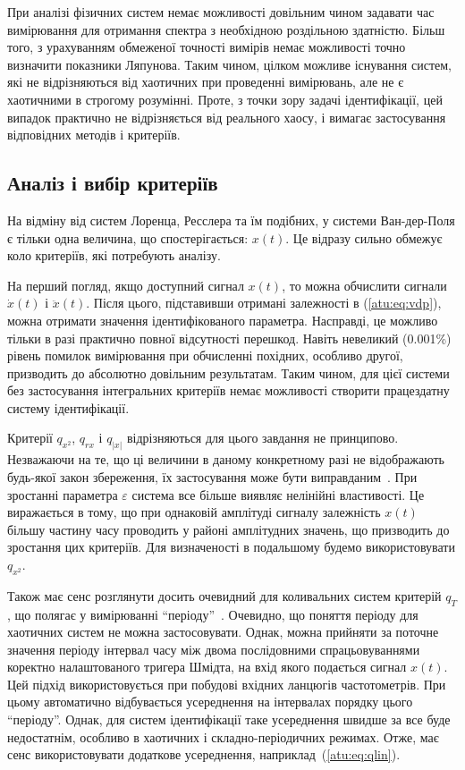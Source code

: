При аналізі фізичних систем немає можливості довільним чином
задавати час вимірювання для отримання спектра з необхідною
роздільною здатністю. Більш того, з урахуванням обмеженої точності вимірів
немає можливості точно визначити показники Ляпунова. Таким
чином, цілком можливе існування систем, які не відрізняються
від хаотичних при проведенні вимірювань, але не є хаотичними в
строгому розумінні. Проте, з точки зору задачі ідентифікації,
цей випадок практично не відрізняється від реального хаосу,
і вимагає застосування відповідних методів і критеріїв.



\subsection{Аналіз і вибір критеріїв}%

На відміну від систем Лоренца, Ресслера та їм подібних, у системи
Ван-дер-Поля є тільки одна величина, що спостерігається: $x(t)$. Це
відразу сильно обмежує коло критеріїв, які потребують аналізу.

На перший погляд, якщо доступний сигнал
$x(t)$, то можна обчислити сигнали
$\dot{x}(t) $ і
$\ddot{x}(t)$. Після цього, підставивши отримані залежності
в (\ref{atu:eq:vdp}), можна отримати значення ідентифікованого
параметра. Насправді, це можливо тільки в разі практично
повної відсутності перешкод. Навіть невеликий (0.001\%) рівень
помилок вимірювання при обчисленні похідних, особливо другої,
призводить до абсолютно довільним результатам. Таким чином,
для цієї системи без застосування інтегральних критеріїв
немає можливості створити працездатну систему ідентифікації.

Критерії
$q_{x^2}$,
$q_{rx}$ і
$q_{|x|}$ відрізняються для цього завдання не
принципово. Незважаючи на те, що ці величини в даному конкретному
разі не відображають будь-якої закон збереження, їх застосування
може бути виправданим~\cite{atu_asau17}. При зростанні параметра
$\varepsilon$ система все більше виявляє нелінійні властивості. Це
виражається в тому, що при однаковій амплітуді сигналу
залежність
$x(t)$ більшу частину часу проводить у районі амплітудних
значень, що призводить до зростання цих критеріїв. Для
визначеності в подальшому будемо використовувати
$q_{x^2}$.

Також має сенс розглянути досить очевидний для коливальних
систем критерій
$q_T$, що полягає у вимірюванні ``періоду''~\cite{atu_asau16}. Очевидно, що
поняття періоду для хаотичних систем не можна застосовувати. Однак,
можна прийняти за поточне значення періоду інтервал часу між
двома послідовними спрацьовуваннями коректно налаштованого
тригера Шмідта, на вхід якого подається сигнал
$x(t)$. Цей підхід використовується при побудові вхідних
ланцюгів частотометрів. При цьому автоматично відбувається
усереднення на інтервалах порядку цього ``періоду''. Однак,
для систем ідентифікації таке усереднення швидше за все
буде недостатнім, особливо в хаотичних і складно-періодичних
режимах. Отже, має сенс використовувати додаткове усереднення,
наприклад~(\ref{atu:eq:qlin}).

